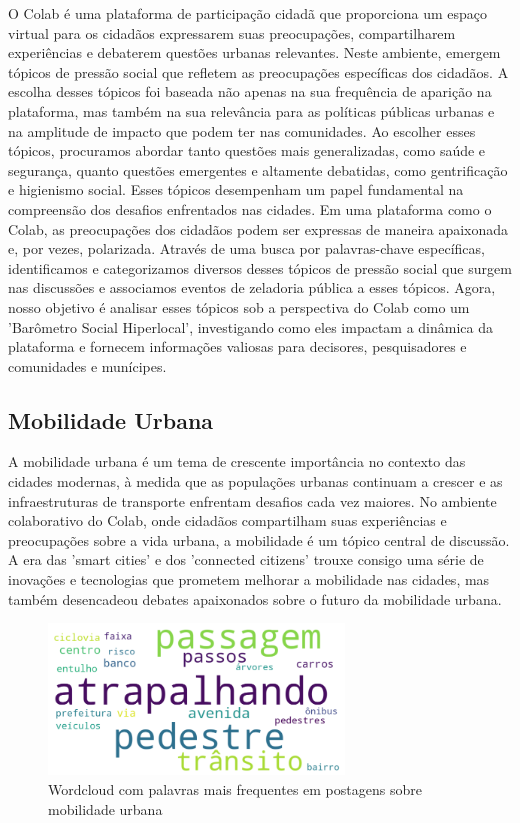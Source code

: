 O Colab é uma plataforma de participação cidadã que proporciona um espaço virtual para os cidadãos expressarem suas preocupações, compartilharem experiências e debaterem questões urbanas relevantes. Neste ambiente, emergem tópicos de pressão social que refletem as preocupações específicas dos cidadãos. A escolha desses tópicos foi baseada não apenas na sua frequência de aparição na plataforma, mas também na sua relevância para as políticas públicas urbanas e na amplitude de impacto que podem ter nas comunidades. Ao escolher esses tópicos, procuramos abordar tanto questões mais generalizadas, como saúde e segurança, quanto questões emergentes e altamente debatidas, como gentrificação e higienismo social. Esses tópicos desempenham um papel fundamental na compreensão dos desafios enfrentados nas cidades. Em uma plataforma como o Colab, as preocupações dos cidadãos podem ser expressas de maneira apaixonada e, por vezes, polarizada. Através de uma busca por palavras-chave específicas, identificamos e categorizamos diversos desses tópicos de pressão social que surgem nas discussões e associamos eventos de zeladoria pública a esses tópicos. Agora, nosso objetivo é analisar esses tópicos sob a perspectiva do Colab como um 'Barômetro Social Hiperlocal', investigando como eles impactam a dinâmica da plataforma e fornecem informações valiosas para decisores, pesquisadores e comunidades e munícipes.

\subsection{Mobilidade Urbana}

A mobilidade urbana é um tema de crescente importância no contexto das cidades modernas, à medida que as populações urbanas continuam a crescer e as infraestruturas de transporte enfrentam desafios cada vez maiores. No ambiente colaborativo do Colab, onde cidadãos compartilham suas experiências e preocupações sobre a vida urbana, a mobilidade é um tópico central de discussão. A era das 'smart cities' e dos 'connected citizens' trouxe consigo uma série de inovações e tecnologias que prometem melhorar a mobilidade nas cidades, mas também desencadeou debates apaixonados sobre o futuro da mobilidade urbana.

\begin{figure}[htb]
	\centering
	\includegraphics[width=0.7\textwidth]{images/wordcloud_mobility.png}
	\caption{Wordcloud com palavras mais frequentes em postagens sobre mobilidade urbana}
	\label{fig:wordcloud_mobility}
\end{figure}

